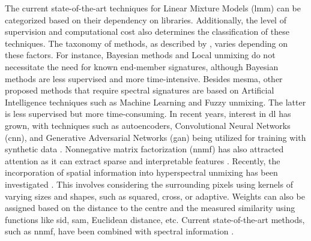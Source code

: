 The current state-of-the-art techniques for Linear Mixture Models (\acrshort{lmm}) can be categorized based on their dependency on libraries. Additionally, the level of supervision and computational cost also determines the classification of these techniques. The taxonomy of methods, as described by \cite{borsoi_spectral_2021}, varies depending on these factors. For instance, Bayesian methods and Local unmixing do not necessitate the need for known end-member signatures, although Bayesian methods are less supervised and more time-intensive. Besides \acrshort{mesma}, other proposed methods that require spectral signatures are based on Artificial Intelligence techniques such as Machine Learning and Fuzzy unmixing. The latter is less supervised but more time-consuming. In recent years, interest in \acrshort{dl} has grown, with techniques such as autoencoders, Convolutional Neural Networks (\acrshort{cnn}), and Generative Adversarial Networks (\acrshort{gan}) being utilized for training with synthetic data \cite{bhatt_deep_2020}. Nonnegative matrix factorization (\acrshort{nnmf}) has also attracted attention as it can extract sparse and interpretable features \cite{hruska_machine_2018}. Recently, the incorporation of spatial information into hyperspectral unmixing has been investigated \cite{shi_incorporating_2014}. This involves considering the surrounding pixels using kernels of varying sizes and shapes, such as squared, cross, or adaptive. Weights can also be assigned based on the distance to the centre and the measured similarity using functions like \acrshort{sid}, \acrshort{sam}, Euclidean distance, etc. Current state-of-the-art methods, such as \acrshort{nnmf}, have been combined with spectral information \cite{zhang_spectral-spatial_2022}.

